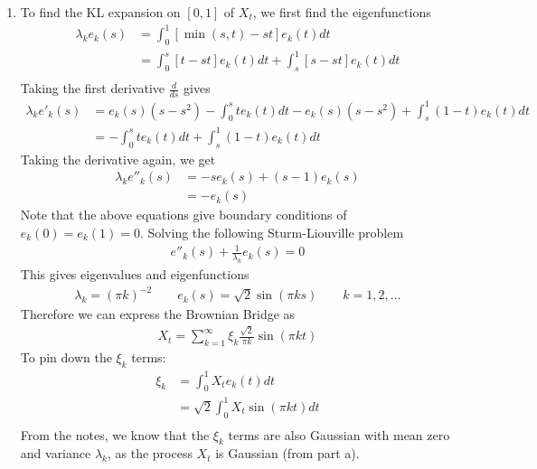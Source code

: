 \documentclass[12pt]{article}
\theoremstyle{plain}
\theoremstyle{definition}
\theoremstyle{remark}
\begin{document}
\begin{enumerate}
\begin{enumerate}
      \item %
        To find the KL expansion on $[0,1]$ of $X_t$, we first find the
        eigenfunctions
        \begin{align*}
          \lambda_k e_k(s) &=
          \int^1_0 \left[ \min(s,t) - st\right]e_k(t) dt \\
          &=
          \int^s_0 \left[t - st\right]e_k(t) dt +
          \int^1_s \left[ s - st\right]e_k(t) dt \\
        \end{align*}
        Taking the first derivative $\frac{d}{ds}$ gives
        \begin{align*}
          \lambda_k e'_k(s) &=
          e_k(s)(s-s^2) - \int^s_0 te_k(t) dt
          -  e_k(s)(s-s^2) + \int^1_s (1-t) e_k(t) dt \\
          &= - \int^s_0 te_k(t) dt
           + \int^1_s (1-t) e_k(t) dt
        \end{align*}
        Taking the derivative again, we get
        \begin{align*}
          \lambda_k e''_k(s) &=  -s e_k(s) + (s-1)e_k(s)\\
          &= -e_k(s)
        \end{align*}
        Note that the above equations give boundary conditions of
        $e_k(0)=e_k(1)=0$. Solving the following Sturm-Liouville problem
        \begin{align*}
          e''_k(s) +\frac{1}{\lambda_k} e_k(s) = 0
        \end{align*}
        This gives eigenvalues and eigenfunctions
        \begin{align*}
          \lambda_k = \left(\pi k\right)^{-2}
          \qquad
          e_k(s) = \sqrt{2} \sin\left( \pi ks \right)
          \qquad k = 1,2,\ldots
        \end{align*}
        Therefore we can express the Brownian Bridge as
        \begin{align*}
          X_t = \sum_{k=1}^\infty \xi_k \frac{\sqrt{2}}{\pi k}
          \sin(\pi kt)
        \end{align*}
        To pin down the $\xi_k$ terms:
        \begin{align*}
          \xi_k
            &= \int^1_0 X_t e_k(t) dt \\
            &= \sqrt{2} \int^1_0 X_t \sin(\pi k t) dt \\
        \end{align*}
        From the notes, we know that the $\xi_k$ terms are also Gaussian
        with mean zero and variance $\lambda_k$, as the process $X_t$ is
        Gaussian (from part a).



\end{enumerate}
\end{enumerate}
\end{document}
